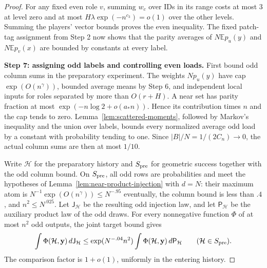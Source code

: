 \begin{proof}
For any fixed even role \(v\), summing \(w_c\) over IDs in its range
costs at most \(3\) at level zero and at most
\(H\lambda\exp(-n^{c_3})=o(1)\) over the other levels. Summing the
players' vector bounds proves the even inequality. The fixed patch-tag
assignment from Step 2 now shows that the parity averages of
\(N\mathbb E p_u(y)\) and \(N\mathbb E p_v(x)\) are bounded by
constants at every label.

\noindent\textbf{Step 7: assigning odd labels and controlling even loads.}\quad
First bound odd column sums in the preparatory experiment. The weights
\(Np_u(y)\) have cap \(\exp(O(n^\gamma))\), bounded average means by
Step 6, and independent local inputs for roles separated by more than
\(O(r+H)\). A near set has parity fraction at most
\(\exp(-n\log2+o(a_*n))\). Hence its contribution times \(n\) and
the cap tends to zero. Lemma~\ref{lem:scattered-moments}, followed by
Markov's inequality and the union over labels, bounds every normalized
average odd load by a constant with probability tending to one.
Since \(|B|/N=1/(2C_n)\to0\), the actual column sums are then at most
\(1/10\).

Write \(\mathcal H\) for the preparatory history and
\(S_{\rm pre}\) for geometric success together with the odd column
bound. On \(S_{\rm pre}\), all odd rows are probabilities and meet the hypotheses of
Lemma~\ref{lem:near-product-injection} with \(d=N\): their maximum atom
is \(N^{-1}\exp(O(n^\gamma))\le N^{-.95}\) eventually, the column
bound is less than \(.4\), and \(n^2\le N^{.025}\). Let
\(\mathsf J_{\mathcal H}\) be the resulting odd injection law, and
let \(\mathsf P_{\mathcal H}\) be the auxiliary product law of the odd
draws. For every nonnegative function \(\Phi\) of at most \(n^2\) odd
outputs, the joint target bound gives
\[
 \int\Phi(\mathcal H,\mathbf y)\,d\mathsf J_{\mathcal H}
 \le \exp(N^{-.04}n^2)
       \int\Phi(\mathcal H,\mathbf y)\,d\mathsf P_{\mathcal H}
       \qquad(\mathcal H\in S_{\rm pre}).
\]
The comparison factor is \(1+o(1)\), uniformly in the entering history.


\end{proof}

